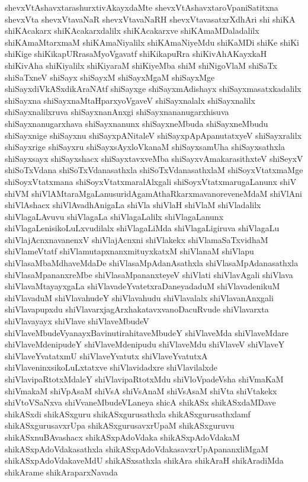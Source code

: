 {shevxVtAshavxtarashurxtivAkayxdaMte
shevxVtAshavxtaroVpaniSatitxna
shevxVta
shevxVtavaNaR
shevxVtavaNaRH
shevxVtavasatxrXdhAri
shi
shiKA
shiKAcakarx
shiKAcakarxdalilx
shiKAcakarxve
shiKAmaMDaladalilx
shiKAmaMtarxmaM
shiKAmaNiyalilx
shiKAmaNiyeMdu
shiKaMDi
shiKe
shiKi
shiKige
shiKikapURrasaMyoVgavatf
shiKikapuRra
shiKivAhAKayxkaH
shiKivAha
shiKiyalilx
shiKiyaraM
shiKiyeMba
shiM
shiNigoVlaM
shiSaTx
shiSaTxneV
shiSayx
shiSayxM
shiSayxMgaM
shiSayxMge
shiSayxdiVkASxdikAraNAtf
shiSayxge
shiSayxmAdishayx
shiSayxmasatxkadalilx
shiSayxna
shiSayxnaMtaHparxyoVgaveV
shiSayxnalalx
shiSayxnalilx
shiSayxnalilxruva
shiSayxnanAnxgi
shiSayxnananugarxhisuva
shiSayxnanugarxhava
shiSayxnanunx
shiSayxneMbuda
shiSayxneMbudu
shiSayxnige
shiSayxnu
shiSayxpANitaleV
shiSayxpApApanutatxyeV
shiSayxralilx
shiSayxrige
shiSayxru
shiSayxsAyxloVkanaM
shiSayxsamUha
shiSayxsathxla
shiSayxsayx
shiSayxshacx
shiSayxtavxveMba
shiSayxvAmakarasithxteV
shiSeyxV
shiSoTxVdana
shiSoTxVdanasathxla
shiSoTxVdanasathxlaM
shiSoyxVtatxmaMge
shiSoyxVtatxmana
shiSoyxVtatxmaralAlxgali
shiSoyxVtatxmarugaLanunx
shiV
shiVM
shiVlAMtaraMgaLanusuridAgamAthaRkarxmavanoreveneMdaM
shiVlAni
shiVlAshacx
shiVlAvadhAnigaLa
shiVla
shiVlaH
shiVlaM
shiVladalilx
shiVlagaLAvuvu
shiVlagaLa
shiVlagaLalilx
shiVlagaLanunx
shiVlagaLenisikoLuLxvudilalx
shiVlagaLiMda
shiVlagaLigiruva
shiVlagaLu
shiVlajAcnxnavanenxV
shiVlajAcnxni
shiVlakekx
shiVlamaSaTxvidhaM
shiVlameVtatf
shiVlamutapxnanxmituyxkatxM
shiVlanaM
shiVlapu
shiVlasaMbaMdhaveMdaDe
shiVlasaMpAdanAsathxla
shiVlasaMpAdanasathxla
shiVlasaMpananxreMbe
shiVlasaMpananxteyeV
shiVlati
shiVlavAgali
shiVlava
shiVlavaMtayayxgaLa
shiVlavadeYvatetxraDaneyadaduM
shiVlavadenikuM
shiVlavaduM
shiVlavahudeY
shiVlavahudu
shiVlavalalx
shiVlavanAnxgali
shiVlavapupxdu
shiVlavarxjagArxhakatavxvanoDacuRvude
shiVlavarxta
shiVlavayayx
shiVlave
shiVlaveMbudeV
shiVlaveMbudeVyanayxBavinutirahitaveMbudeY
shiVlaveMda
shiVlaveMdare
shiVlaveMdenipudeY
shiVlaveMdenipudu
shiVlaveMdu
shiVlaveV
shiVlaveY
shiVlaveYvatatxmU
shiVlaveYvatutx
shiVlaveYvatutxA
shiVlaveninxsikoLuLxtatxve
shiVlavidadxre
shiVlavilalxde
shiVlavipaRtotxMdaleY
shiVlavipaRtotxMdu
shiVloVpadeVsha
shiVmaKaM
shiVmakaM
shiVpAsaM
shiVsA
shiVsAnaM
shiVsAsaM
shiVta
shiVtakekx
shiVtoVSaNxva
shiVvaneMbudeVLaneya
shicA
shikASx
shikASxdaMDave
shikASxdi
shikASxguru
shikASxgurusathxla
shikASxgurusathxlamf
shikASxgurusavxrUpa
shikASxgurusavxrUpaM
shikASxguruvu
shikASxnuBAvashacx
shikASxpAdoVdaka
shikASxpAdoVdakaM
shikASxpAdoVdakasathxla
shikASxpAdoVdakasavxrUpApananxliMgaM
shikASxpAdoVdakaveMdU
shikASxsathxla
shikAra
shikAraH
shikAradiMda
shikArame
shikAraparxNavada
}
